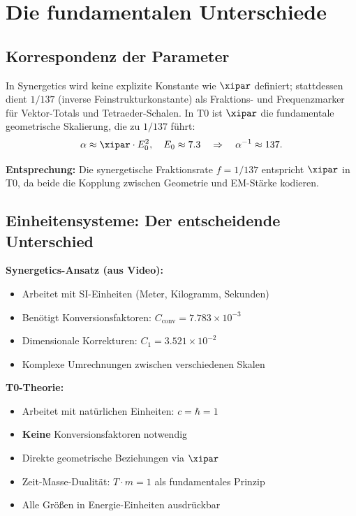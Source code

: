	\section{Die fundamentalen Unterschiede}
	
	\subsection{Korrespondenz der Parameter}
	
	In Synergetics wird keine explizite Konstante wie $\xipar$ definiert; stattdessen dient $1/137$ (inverse Feinstrukturkonstante) als Fraktions- und Frequenzmarker für Vektor-Totals und Tetraeder-Schalen. In T0 ist $\xipar$ die fundamentale geometrische Skalierung, die zu $1/137$ führt:
	\begin{equation}
		\alpha \approx \xipar \cdot E_0^2, \quad E_0 \approx 7.3 \quad \Rightarrow \quad \alpha^{-1} \approx 137.
	\end{equation}
	
	\textbf{Entsprechung:} Die synergetische Fraktionsrate $f = 1/137$ entspricht $\xipar$ in T0, da beide die Kopplung zwischen Geometrie und EM-Stärke kodieren.
	
	\subsection{Einheitensysteme: Der entscheidende Unterschied}
	
	\begin{vergleich}
		\textbf{Synergetics-Ansatz (aus Video):}
		\begin{itemize}
			\item Arbeitet mit SI-Einheiten (Meter, Kilogramm, Sekunden)
			\item Benötigt Konversionsfaktoren: $C_{\text{conv}} = 7.783 \times 10^{-3}$
			\item Dimensionale Korrekturen: $C_1 = 3.521 \times 10^{-2}$
			\item Komplexe Umrechnungen zwischen verschiedenen Skalen
		\end{itemize}
		
		\textbf{T0-Theorie:}
		\begin{itemize}
			\item Arbeitet mit natürlichen Einheiten: $c = \hbar = 1$
			\item \textbf{Keine} Konversionsfaktoren notwendig
			\item Direkte geometrische Beziehungen via $\xipar$
			\item Zeit-Masse-Dualität: $T \cdot m = 1$ als fundamentales Prinzip
			\item Alle Größen in Energie-Einheiten ausdrückbar
		\end{itemize}
	\end{vergleich}
	

